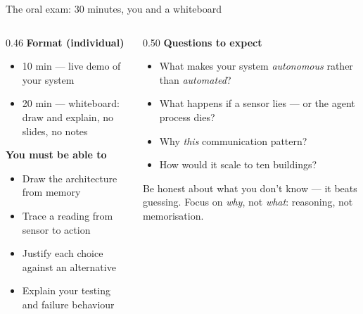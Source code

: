 \documentclass[aspectratio=169]{beamer}
\newcommand{\hilite}[1]{\textcolor{accentColor}{#1}}
\newcommand{\subtle}[1]{\textcolor{subtleColor}{#1}}
\begin{document}
\begin{frame}{The oral exam: 30 minutes, you and a whiteboard}
	\begin{columns}[T]
		\begin{column}{0.46\textwidth}
			\textbf{Format \subtle{(individual)}}
			\begin{itemize}
				\item 10 min — live demo of your system
				\item 20 min — \hilite{whiteboard}: draw and explain, \hilite{no slides, no notes}
			\end{itemize}
			\vspace{0.4em}
			\textbf{You must be able to}
			\begin{itemize}
				\item Draw the architecture from memory
				\item Trace a reading from sensor to action
				\item Justify each choice \hilite{against an alternative}
				\item Explain your testing and failure behaviour
			\end{itemize}
		\end{column}
		\begin{column}{0.50\textwidth}
			\textbf{Questions to expect}
			\begin{itemize}
				\item What makes your system \emph{autonomous} rather than \emph{automated}?
				\item What happens if a sensor lies — or the agent process dies?
				\item Why \emph{this} communication pattern?
				\item How would it scale to ten buildings?
			\end{itemize}
			\vspace{0.4em}
			\small\subtle{Be honest about what you don't know — it beats guessing.
			Focus on \emph{why}, not \emph{what}: reasoning, not memorisation.}
		\end{column}
	\end{columns}
\end{frame}
\end{document}
